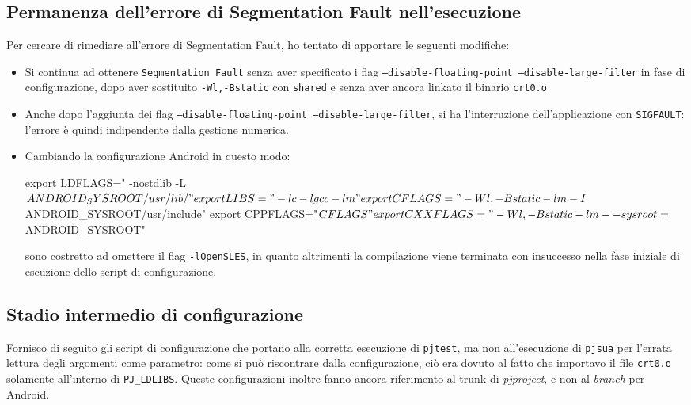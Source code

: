 \subsection{Permanenza dell'errore di Segmentation Fault nell'esecuzione}
Per cercare di rimediare all'errore di Segmentation Fault, ho tentato di 
apportare le seguenti modifiche:
\begin{itemize}
\item Si continua ad ottenere \texttt{\small Segmentation Fault} senza aver specificato
	i flag \texttt{\small --disable-floating-point --disable-large-filter} in fase di 
	configurazione, dopo aver sostituito \texttt{\small -Wl,-Bstatic} con
	\texttt{shared} e senza aver ancora linkato il binario \texttt{crt0.o}
\item Anche dopo l'aggiunta dei flag \texttt{\small --disable-floating-point --disable-large-filter},
	si ha l'interruzione dell'applicazione con \texttt{\small SIGFAULT}: l'errore
	è quindi indipendente dalla gestione numerica.
\item Cambiando la configurazione Android in questo modo:
\begin{bash}
export LDFLAGS=" -nostdlib -L${ANDROID_SYSROOT}/usr/lib/"
export LIBS=" -lc -lgcc -lm "
export CFLAGS=" -Wl,-Bstatic  -lm -I${ANDROID_SYSROOT}/usr/include"
export CPPFLAGS="${CFLAGS}"
export CXXFLAGS=" -Wl,-Bstatic -lm --sysroot=${ANDROID_SYSROOT}"
\end{bash}
       sono costretto ad omettere il flag \texttt{\small -lOpenSLES}, in quanto
       altrimenti la compilazione viene terminata con insuccesso nella fase
       iniziale di escuzione dello script di configurazione. 
\end{itemize}

\subsection{Stadio intermedio di configurazione}
Fornisco di seguito gli script di configurazione che portano alla corretta
esecuzione di \texttt{pjtest}, ma non all'esecuzione di \texttt{pjsua} per l'errata 
lettura degli argomenti come parametro: come si può riscontrare dalla configurazione,
ciò era dovuto al fatto che importavo il file \texttt{crt0.o} solamente all'interno
di \texttt{\small PJ\_LDLIBS}. Queste configurazioni inoltre fanno ancora riferimento
al trunk di \textit{pjproject}, e non al \textit{branch} per Android.



